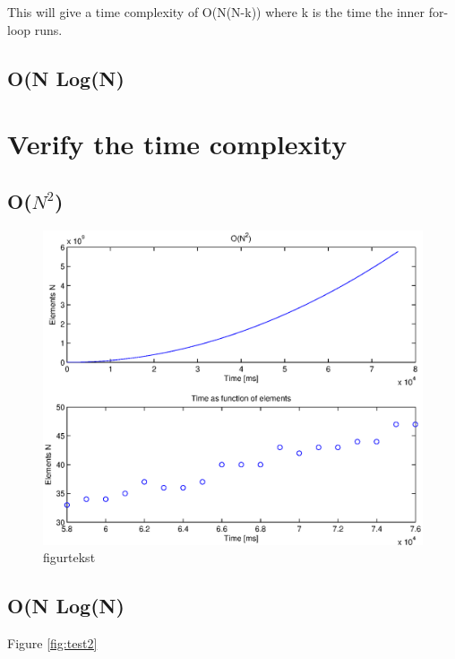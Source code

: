 This will give a time complexity of O(N(N-k)) where k is the time the inner for-loop runs.
\subsection{O(N Log(N)}
\newpage
\section{Verify the time complexity}




\subsection{O(\(N^{2}\))}



\begin{figure}[th!]
\centering
\includegraphics[width=1\textwidth]{./graphics/test1.eps}
\caption[tekst i indholdsfortegnelsen]{figurtekst}
\label{fig:}
\end{figure}
\newpage


\subsection{O(N Log(N)}
Figure \ref{fig:test2}


